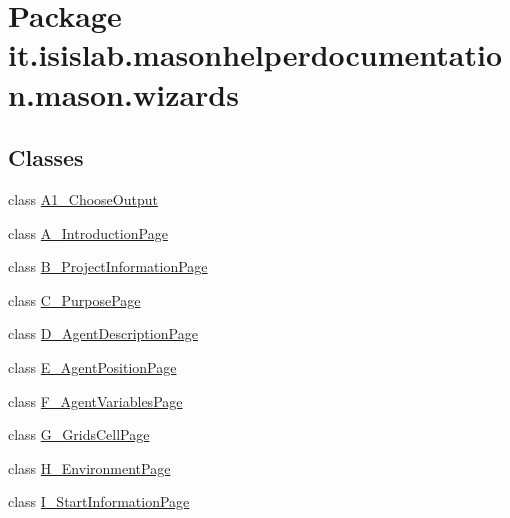 \hypertarget{namespaceit_1_1isislab_1_1masonhelperdocumentation_1_1mason_1_1wizards}{\section{Package it.\-isislab.\-masonhelperdocumentation.\-mason.\-wizards}
\label{namespaceit_1_1isislab_1_1masonhelperdocumentation_1_1mason_1_1wizards}
}
\subsection*{Classes}
\begin{DoxyCompactItemize}
\item 
class \hyperlink{classit_1_1isislab_1_1masonhelperdocumentation_1_1mason_1_1wizards_1_1_a1___choose_output}{A1\-\_\-\-Choose\-Output}
\item 
class \hyperlink{classit_1_1isislab_1_1masonhelperdocumentation_1_1mason_1_1wizards_1_1_a___introduction_page}{A\-\_\-\-Introduction\-Page}
\item 
class \hyperlink{classit_1_1isislab_1_1masonhelperdocumentation_1_1mason_1_1wizards_1_1_b___project_information_page}{B\-\_\-\-Project\-Information\-Page}
\item 
class \hyperlink{classit_1_1isislab_1_1masonhelperdocumentation_1_1mason_1_1wizards_1_1_c___purpose_page}{C\-\_\-\-Purpose\-Page}
\item 
class \hyperlink{classit_1_1isislab_1_1masonhelperdocumentation_1_1mason_1_1wizards_1_1_d___agent_description_page}{D\-\_\-\-Agent\-Description\-Page}
\item 
class \hyperlink{classit_1_1isislab_1_1masonhelperdocumentation_1_1mason_1_1wizards_1_1_e___agent_position_page}{E\-\_\-\-Agent\-Position\-Page}
\item 
class \hyperlink{classit_1_1isislab_1_1masonhelperdocumentation_1_1mason_1_1wizards_1_1_f___agent_variables_page}{F\-\_\-\-Agent\-Variables\-Page}
\item 
class \hyperlink{classit_1_1isislab_1_1masonhelperdocumentation_1_1mason_1_1wizards_1_1_g___grids_cell_page}{G\-\_\-\-Grids\-Cell\-Page}
\item 
class \hyperlink{classit_1_1isislab_1_1masonhelperdocumentation_1_1mason_1_1wizards_1_1_h___environment_page}{H\-\_\-\-Environment\-Page}
\item 
class \hyperlink{classit_1_1isislab_1_1masonhelperdocumentation_1_1mason_1_1wizards_1_1_i___start_information_page}{I\-\_\-\-Start\-Information\-Page}

\end{DoxyCompactItemize}
